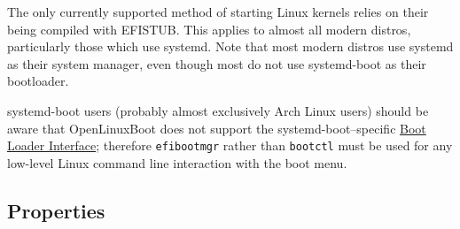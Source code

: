 \documentclass[]{article}
\begin{document}
The only currently supported method of starting Linux kernels relies on their being compiled with EFISTUB.
This applies to almost all modern distros, particularly those which use systemd. Note that most modern
distros use systemd as their system manager, even though most do not use systemd-boot as
their bootloader.

systemd-boot users (probably almost exclusively Arch Linux users) should be aware that OpenLinuxBoot
does not support the systemd-boot--specific \href{https://systemd.io/BOOT\_LOADER\_INTERFACE/}{Boot Loader Interface};
therefore \texttt{efibootmgr} rather than \texttt{bootctl} must be used for any low-level Linux command line interaction
with the boot menu.

\subsection{Properties}\label{uefiprops}
\end{document}
